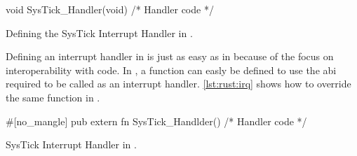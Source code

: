 \begin{listing}[H]
  \begin{ccode}
void SysTick_Handler(void) { /* Handler code */ }
  \end{ccode}
  \caption{Defining the SysTick Interrupt Handler in {\C}.}
  \label{lst:c:irq}
\end{listing}

Defining an interrupt handler in {\rust} is just as easy as in {\C} because of the focus on interoperability with {\C} code.
In {\rust}, a function can easly be defined to use the {\C} \gls{abi} required to be called as an interrupt handler.
\autoref{lst:rust:irq} shows how to override the same  function in {\rust}.

\begin{listing}[H]
  \begin{rustcode}
#[no_mangle] pub extern fn SysTick_Handlder() { /* Handler code */ }
  \end{rustcode}
  \caption{SysTick Interrupt Handler in {\rust}.}
  \label{lst:rust:irq}
\end{listing}
